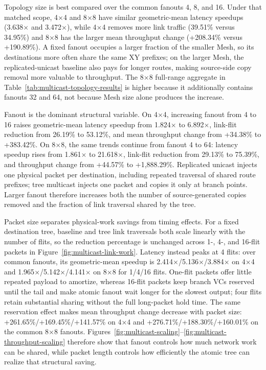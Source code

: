 \documentclass[10pt]{article}
\begin{document}
Topology size is best compared over the common fanouts 4, 8, and 16.  Under
that matched scope, 4$\times$4 and 8$\times$8 have similar geometric-mean
latency speedups (3.638$\times$ and 3.472$\times$), while 4$\times$4 removes
more link traffic (39.51\% versus 34.95\%) and 8$\times$8 has the larger mean
throughput change (+208.34\% versus +190.89\%).  A fixed fanout occupies a
larger fraction of the smaller Mesh, so its destinations more often share the
same XY prefixes; on the larger Mesh, the replicated-unicast baseline also
pays for longer routes, making source-side copy removal more valuable to
throughput.  The 8$\times$8 full-range aggregate in
Table~\ref{tab:multicast-topology-results} is higher because it additionally
contains fanouts 32 and 64, not because Mesh size alone produces the increase.

Fanout is the dominant structural variable.  On 4$\times$4, increasing fanout
from 4 to 16 raises geometric-mean latency speedup from 1.824$\times$ to
6.892$\times$, link-flit reduction from 26.19\% to 53.12\%, and mean
throughput change from +34.38\% to +383.42\%.  On 8$\times$8, the same trends
continue from fanout 4 to 64: latency speedup rises from 1.861$\times$ to
21.618$\times$, link-flit reduction from 29.13\% to 75.39\%, and throughput
change from +44.57\% to +1,888.29\%.  Replicated unicast injects one physical
packet per destination, including repeated traversal of shared route prefixes;
tree multicast injects one packet and copies it only at branch points.  Larger
fanout therefore increases both the number of source-generated copies removed
and the fraction of link traversal shared by the tree.

Packet size separates physical-work savings from timing effects.  For a fixed
destination tree, baseline and tree link traversals both scale linearly with
the number of flits, so the reduction percentage is unchanged across 1-, 4-,
and 16-flit packets in Figure~\ref{fig:multicast-link-work}.  Latency instead
peaks at 4 flits: over common fanouts, its geometric-mean speedup is
2.414$\times$/5.136$\times$/3.884$\times$ on 4$\times$4 and
1.965$\times$/5.142$\times$/4.141$\times$ on 8$\times$8 for 1/4/16 flits.
One-flit packets offer little repeated payload to amortize, whereas 16-flit
packets keep branch VCs reserved until the tail and make atomic fanout wait
longer for the slowest output; four flits retain substantial sharing without
the full long-packet hold time.  The same reservation effect makes mean
throughput change decrease with packet size: +261.65\%/+169.45\%/+141.57\%
on 4$\times$4 and +276.71\%/+188.30\%/+160.01\% on the common 8$\times$8
fanouts.  Figures~\ref{fig:multicast-scaling}--\ref{fig:multicast-throughput-scaling}
therefore show that fanout controls how much network work can be shared, while
packet length controls how efficiently the atomic tree can realize that
structural saving.
\end{document}

